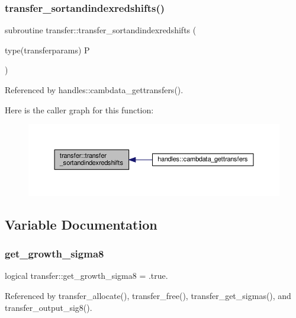 \subsubsection{\texorpdfstring{transfer\+\_\+sortandindexredshifts()}{transfer\_sortandindexredshifts()}}
{\footnotesize\ttfamily subroutine transfer\+::transfer\+\_\+sortandindexredshifts (\begin{DoxyParamCaption}\item[{type(transferparams)}]{P }\end{DoxyParamCaption})}



Referenced by handles\+::cambdata\+\_\+gettransfers().

Here is the caller graph for this function\+:
\nopagebreak
\begin{figure}[H]
\begin{center}
\leavevmode
\includegraphics[width=350pt]{namespacetransfer_a138e96e5b60355e8136607e26339b2a0_icgraph}
\end{center}
\end{figure}


\subsection{Variable Documentation}
\mbox{\label{namespacetransfer_a271d66692c1d4b207c6e033b5a8197e8}} 
\subsubsection{\texorpdfstring{get\+\_\+growth\+\_\+sigma8}{get\_growth\_sigma8}}
{\footnotesize\ttfamily logical transfer\+::get\+\_\+growth\+\_\+sigma8 = .true.}



Referenced by transfer\+\_\+allocate(), transfer\+\_\+free(), transfer\+\_\+get\+\_\+sigmas(), and transfer\+\_\+output\+\_\+sig8().

